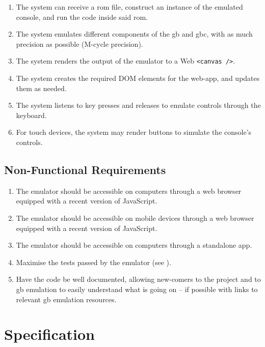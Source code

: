 \documentclass[11pt]{informatics-report}
\begin{document}
\begin{enumerate}[start=1,label=F\arabic*.]
    \item The system can receive a \gls{rom} file, construct an instance of the emulated console, and run the code inside said \gls{rom}.
    \item The system emulates different components of the \gls{gb} and \gls{gbc}, with as much precision as possible (M-cycle precision).
    \item The system renders the output of the emulator to a Web \texttt{<canvas />}.
    \item The system creates the required DOM elements for the web-app, and updates them as needed.
    \item The system listens to key presses and releases to emulate controls through the keyboard.
    \item For touch devices, the system may render buttons to simulate the console's controls.
\end{enumerate}

\subsection{Non-Functional Requirements}

\begin{enumerate}[start=1,label=N\arabic*.]
    \item The emulator should be accessible on computers through a web browser equipped with a recent version of JavaScript.
    \item The emulator should be accessible on mobile devices through a web browser equipped with a recent version of JavaScript.
    \item The emulator should be accessible on computers through a standalone app.
    \item Maximise the tests passed by the emulator (see ).
    \item Have the code be well documented, allowing new-comers to the project and to \gls{gb} emulation to easily understand what is going on -- if possible with links to relevant \glsdesc{gb} emulation resources.
\end{enumerate}


\section{Specification}
\end{document}
